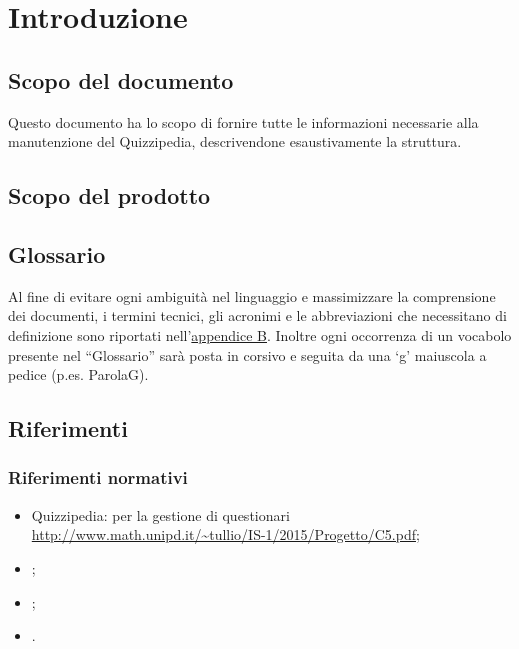 \documentclass[a4paper, titlepage]{article}
\begin{document}
\pagestyle{fancy}	

\maketitle



\newpage
\tableofcontents

\newpage
\listoffigures

\newpage
\listoftables

\newpage
\clearpage
{}

	\section{Introduzione}
	\subsection{Scopo del documento}
	Questo documento ha lo scopo di fornire tutte le informazioni necessarie alla manutenzione del 
	Quizzipedia, descrivendone esaustivamente la struttura.
	
	\subsection{Scopo del prodotto}
	\SCOPO
	
	\subsection{Glossario}
	Al fine di evitare ogni ambiguità nel linguaggio e massimizzare la comprensione dei documenti, i termini tecnici, gli acronimi e le abbreviazioni che necessitano di definizione sono riportati nell'\hyperref[gl]{appendice B}.
	Inoltre ogni occorrenza di un vocabolo presente nel “Glossario” sarà posta in corsivo e seguita da
	una ‘g’ maiuscola a pedice (p.es. ParolaG).
	
	\subsection{Riferimenti}	
	\subsubsection{Riferimenti normativi}
	\begin{itemize}
		\item {} Quizzipedia:  per la gestione di questionari \newline \url{http://www.math.unipd.it/~tullio/IS-1/2015/Progetto/C5.pdf};
		\item {} \NdPdoc;
		\item {} \AdRdoc;
		\item {} \STdoc.
		
	\end{itemize}
\end{document}

